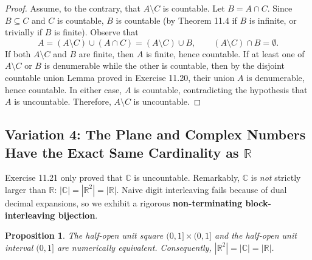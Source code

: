 \documentclass[11pt, letterpaper]{article}
\newtheorem{proposition}[theorem]{Proposition}
\theoremstyle{definition}
\theoremstyle{remark}
\begin{document}
\begin{proof}
Assume, to the contrary, that $A \setminus C$ is countable. Let $B = A \cap C$. Since $B \subseteq C$ and $C$ is countable, $B$ is countable (by Theorem 11.4 if $B$ is infinite, or trivially if $B$ is finite). Observe that
\[
A = (A \setminus C) \cup (A \cap C) = (A \setminus C) \cup B, \qquad (A \setminus C) \cap B = \emptyset.
\]
If both $A \setminus C$ and $B$ are finite, then $A$ is finite, hence countable. If at least one of $A \setminus C$ or $B$ is denumerable while the other is countable, then by the disjoint countable union Lemma proved in Exercise 11.20, their union $A$ is denumerable, hence countable. In either case, $A$ is countable, contradicting the hypothesis that $A$ is uncountable. Therefore, $A \setminus C$ is uncountable.
\end{proof}

\subsection{Variation 4: The Plane and Complex Numbers Have the Exact Same Cardinality as $\mathbb{R}$}

Exercise 11.21 only proved that $\mathbb{C}$ is uncountable. Remarkably, $\mathbb{C}$ is \emph{not} strictly larger than $\mathbb{R}$: $|\mathbb{C}| = |\mathbb{R}^2| = |\mathbb{R}|$. Naive digit interleaving fails because of dual decimal expansions, so we exhibit a rigorous \textbf{non-terminating block-interleaving bijection}.

\begin{proposition}
The half-open unit square $(0, 1] \times (0, 1]$ and the half-open unit interval $(0, 1]$ are numerically equivalent. Consequently, $|\mathbb{R}^2| = |\mathbb{C}| = |\mathbb{R}|$.
\end{proposition}
\end{document}
